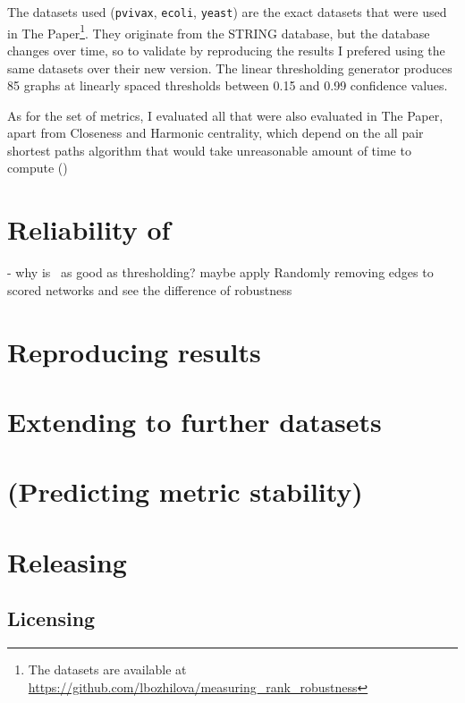 The datasets used (\texttt{pvivax}, \texttt{ecoli}, \texttt{yeast}) are the exact datasets that were used in The Paper\footnote{The datasets are available at \url{https://github.com/lbozhilova/measuring_rank_robustness}}.
They originate from the STRING database, but the database changes over time, so to validate \graffs by reproducing the results I prefered using the same datasets over their new version.
The linear thresholding generator produces 85 graphs at linearly spaced thresholds between 0.15 and 0.99 confidence values.

As for the set of metrics, I evaluated all that were also evaluated in The Paper, apart from Closeness and Harmonic centrality, which depend on the all pair shortest paths algorithm that would take unreasonable amount of time to compute ()



\section{Reliability of \graffs}

- why is~ as good as thresholding?
maybe apply Randomly removing edges to scored networks and see the difference of robustness


\section{Reproducing results}


\section{Extending to further datasets}


\section{(Predicting metric stability)}


\section{Releasing \graffs}

\subsection{Licensing}
